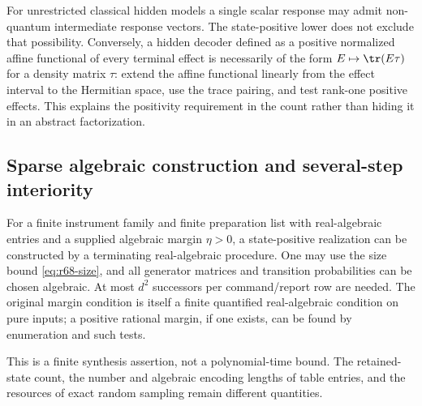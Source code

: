 For unrestricted classical hidden models a single scalar response may admit non-quantum intermediate response vectors. The state-positive lower does not exclude that possibility. Conversely, a hidden decoder defined as a positive normalized affine functional of every terminal effect is necessarily of the form $E\mapsto\tr(E\tau)$ for a density matrix $\tau$: extend the affine functional linearly from the effect interval to the Hermitian space, use the trace pairing, and test rank-one positive effects. This explains the positivity requirement in the count rather than hiding it in an abstract factorization.

\subsection{Sparse algebraic construction and several-step interiority}
\begin{proposition}\label{prop:r68-algebraic}
For a finite instrument family and finite preparation list with real-algebraic entries and a supplied algebraic margin $\eta>0$, a state-positive realization can be constructed by a terminating real-algebraic procedure. One may use the size bound \eqref{eq:r68-size}, and all generator matrices and transition probabilities can be chosen algebraic. At most $d^2$ successors per command/report row are needed. The original margin condition is itself a finite quantified real-algebraic condition on pure inputs; a positive rational margin, if one exists, can be found by enumeration and such tests.

This is a finite synthesis assertion, not a polynomial-time bound. The retained-state count, the number and algebraic encoding lengths of table entries, and the resources of exact random sampling remain different quantities.
\end{proposition}
